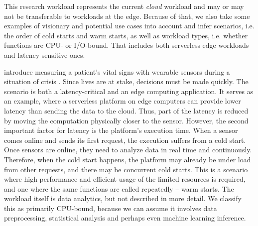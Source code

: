 This research workload represents the current \emph{cloud} workload and may or may not be transferable to workloads at the edge. Because of that, we also take some examples of visionary and potential use cases into account and infer scenarios, i.e. the order of cold starts and warm starts, as well as workload types, i.e. whether functions are CPU- or I/O-bound. That includes both serverless edge workloads and latency-sensitive ones.



\begin{description}[style=multiline, leftmargin=2.5cm, font=\bfseries]

    \item[Vital Signs Analysis] \citeauthor{Nastic2017} introduce measuring a patient's vital signs with wearable sensors during a situation of crisis \cite{Nastic2017}. Since lives are at stake, decisions must be made quickly. The scenario is both a latency-critical and an edge computing application. It serves as an example, where a serverless platform on edge computers can provide lower latency than sending the data to the cloud. Thus, part of the latency is reduced by moving the computation physically closer to the sensor. However, the second important factor for latency is the platform's execution time. When a sensor comes online and sends its first request, the execution suffers from a cold start. Once sensors are online, they need to analyze data in real time and continuously. Therefore, when the cold start happens, the platform may already be under load from other requests, and there may be concurrent cold starts. This is a scenario where high performance and efficient usage of the limited resources is required, and one where the same functions are called repeatedly -- warm starts.
    The workload itself is data analytics, but not described in more detail. We classify this as primarily CPU-bound, because we can assume it involves data preprocessing, statistical analysis and perhaps even machine learning inference.


\end{description}
